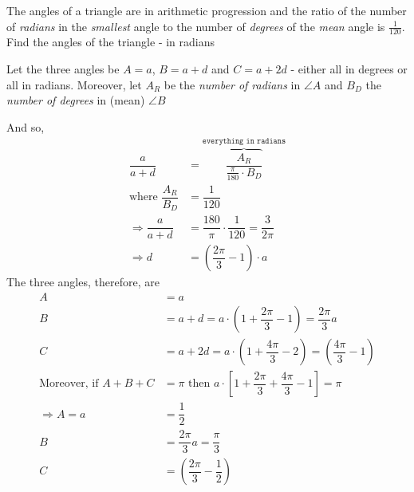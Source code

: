 

\question[3] The angles of a triangle are in arithmetic progression and the ratio of 
the number of \textit{radians} in the \textit{smallest} angle to the number of 
\textit{degrees} of the \textit{mean} angle is $\frac{1}{120}$. Find the angles 
of the triangle - in radians 


\ifprintanswers
\fi 

\begin{solution}[\halfpage]
   Let the three angles be $A=a$, $B=a+d$ and $C=a+2d$ - either all in degrees or all in radians. 
   Moreover, let $A_R$ be the \textit{number of radians} in $\angle A$ and $B_D$ the
   \textit{number of degrees} in (mean) $\angle B$
   
   And so, 
   \begin{align}
       \dfrac{a}{a+d} &= \overbrace{\dfrac{A_R}{\frac{\pi}{180}\cdot B_D}}^{\texttt{everything in radians}} \\
       \text{where } \dfrac{A_R}{B_D} &= \dfrac{1}{120} \\
       \Rightarrow \dfrac{a}{a+d} &= \dfrac{180}{\pi}\cdot\dfrac{1}{120} = \dfrac{3}{2\pi} \\
       \Rightarrow d &= \left( \dfrac{2\pi}{3}-1\right)\cdot a 
   \end{align}
   The three angles, therefore, are 
   \begin{align}
      A &= a \\
      B &= a + d = a\cdot\left(1 + \dfrac{2\pi}{3} - 1 \right) = \dfrac{2\pi}{3}a\\
      C &= a + 2d = a\cdot\left( 1 + \dfrac{4\pi}{3} - 2\right) = \left( \dfrac{4\pi}{3} - 1\right) \\
      \text{Moreover, if } A + B + C &= \pi \text{ then } 
      a\cdot\left[1 + \dfrac{2\pi}{3} + \dfrac{4\pi}{3} - 1 \right] = \pi \\
      \Rightarrow A = a &= \dfrac{1}{2} \\
      B &= \dfrac{2\pi}{3}a = \dfrac{\pi}{3} \\
      C &= \left(\dfrac{2\pi}{3} - \dfrac{1}{2} \right)
   \end{align}
\end{solution}
